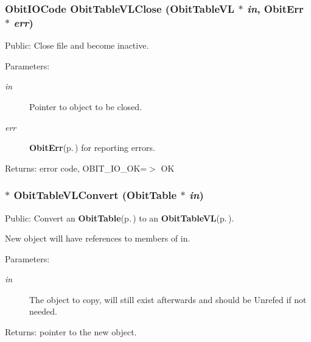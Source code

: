 \subsubsection{\setlength{\rightskip}{0pt plus 5cm}Obit\-IOCode Obit\-Table\-VLClose ({\bf Obit\-Table\-VL} $\ast$ {\em in}, {\bf Obit\-Err} $\ast$ {\em err})}\label{ObitTableVL_8c_a25}


Public: Close file and become inactive. 

\begin{Desc}
\item[Parameters:]
\begin{description}
\item[{\em in}]Pointer to object to be closed. \item[{\em err}]{\bf Obit\-Err}{\rm (p.\,\pageref{structObitErr})} for reporting errors. \end{description}
\end{Desc}
\begin{Desc}
\item[Returns:]error code, OBIT\_\-IO\_\-OK=$>$ OK \end{Desc}
\subsubsection{$\ast$ Obit\-Table\-VLConvert ({\bf Obit\-Table} $\ast$ {\em in})}\label{ObitTableVL_8c_a19}


Public: Convert an {\bf Obit\-Table}{\rm (p.\,\pageref{structObitTable})} to an {\bf Obit\-Table\-VL}{\rm (p.\,\pageref{structObitTableVL})}. 

New object will have references to members of in. \begin{Desc}
\item[Parameters:]
\begin{description}
\item[{\em in}]The object to copy, will still exist afterwards and should be Unrefed if not needed. \end{description}
\end{Desc}
\begin{Desc}
\item[Returns:]pointer to the new object. \end{Desc}
